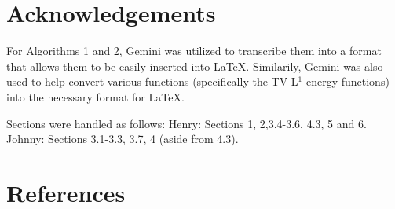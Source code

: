 \documentclass[10pt,twocolumn]{article}
\begin{document}
\section*{Acknowledgements}

For Algorithms 1 and 2, Gemini was utilized to transcribe them into a format that allows them to be easily inserted into LaTeX. Similarily, Gemini was also used to help convert various functions (specifically the TV-L$^1$ energy functions) into the necessary format for LaTeX. 

Sections were handled as follows:
Henry: Sections 1, 2,3.4-3.6, 4.3, 5 and 6.
Johnny: Sections 3.1-3.3, 3.7, 4 (aside from 4.3).

\section*{References}
\end{document}
